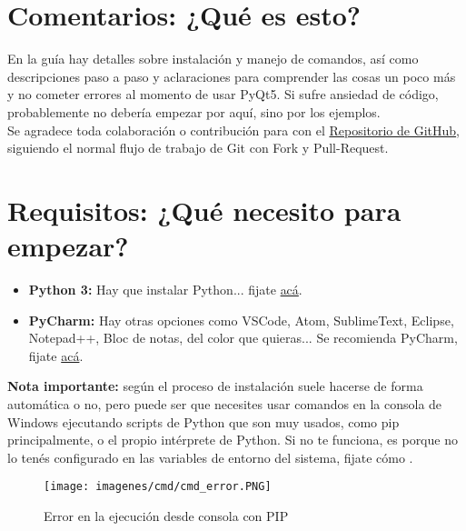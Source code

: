 \section{Comentarios: ¿Qu\'e es esto?}
En la gu\'ia hay detalles sobre instalaci\'on y manejo de comandos, as\'i como descripciones paso a paso y aclaraciones para comprender
las cosas un poco m\'as y no cometer errores al momento de usar PyQt5. Si sufre ansiedad de c\'odigo, probablemente no deber\'ia empezar por aqu\'i, sino por los ejemplos.
\\
Se agradece toda colaboraci\'on o contribuci\'on para con el \href{https://github.com/nicotrozzo/pyqt5-tutorials}{Repositorio de GitHub}, siguiendo el normal flujo de trabajo de Git con Fork y Pull-Request.

\section{Requisitos: ¿Qu\'e necesito para empezar?}

\begin{itemize}
    \item \textbf{Python 3:} Hay que instalar Python... fijate \href{https://www.python.org/}{ac\'a}.
    \item \textbf{PyCharm:} Hay otras opciones como VSCode, Atom, SublimeText, Eclipse, Notepad++, Bloc de notas, del color que quieras... Se recomienda PyCharm, fijate \href{https://www.jetbrains.com/pycharm/}{ac\'a}.
\end{itemize}

\textbf{Nota importante:} seg\'un el proceso de instalaci\'on suele hacerse de forma autom\'atica o no, pero puede ser que necesites usar comandos en la consola de Windows ejecutando scripts de Python que son muy usados,
como pip principalmente, o el propio int\'erprete de Python. Si no te funciona, es porque no lo ten\'es configurado en las variables de entorno del sistema, fijate c\'omo .

\begin{figure}[H]
    \centering
    \texttt{[image: imagenes/cmd/cmd\_error.PNG]}
    \caption{Error en la ejecuci\'on desde consola con PIP}
\end{figure}

